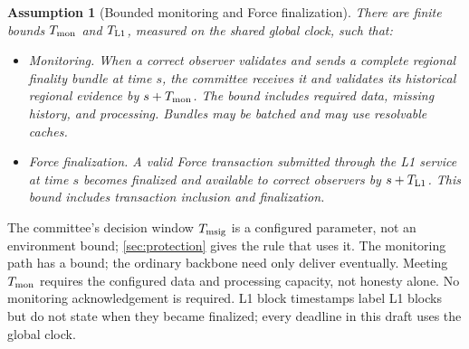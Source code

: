 \documentclass[11pt,a4paper]{article}
\newif\ifrevmarks
\newcommand{\Rv}[1]{\ifrevmarks\leavevmode{\color{rvBlue}#1}\else#1\fi}
\newcommand{\Cid}[1]{\ifrevmarks\textsuperscript{\hyperlink{chg:#1}{\color{rvBlue}\sffamily\scriptsize#1}}\fi}
\newtheorem{assumption}[assumption]{Assumption}
\begin{document}
\begin{assumption}[Bounded monitoring and Force finalization]
\label{ass:monitor}
\Rv{There are finite bounds $T_{\rm mon}$ and $T_{\rm L1}$,
measured on the shared global clock, such that:}
\begin{itemize}
\item \Rv{\emph{Monitoring.}} When a correct observer validates and sends a complete regional
finality bundle \Rv{at time $s$}, the \Rv{committee} receives it and validates its historical
regional evidence \Rv{by $s+T_{\rm mon}$}. The bound includes required data, missing history,
and processing. Bundles may be batched and may use resolvable caches.
\item \Rv{\emph{Force finalization.}} A valid Force transaction submitted through the L1 service \Rv{at
time $s$} becomes finalized and available to correct observers \Rv{by
$s+T_{\rm L1}$}. This bound includes transaction inclusion and finalization.
\end{itemize}
\end{assumption}
\Rv{The committee's decision window $T_{\rm msig}$ is a configured
parameter, not an environment bound; \cref{sec:protection} gives the rule
that uses it.} The monitoring path has a bound; the ordinary backbone need only deliver
eventually. \Rv{Meeting $T_{\rm mon}$ requires the configured data and
processing capacity, not honesty alone. No monitoring acknowledgement is
required. L1 block timestamps label L1 blocks but do not state when they
became finalized; every deadline in this draft uses the global clock.}
\end{document}
